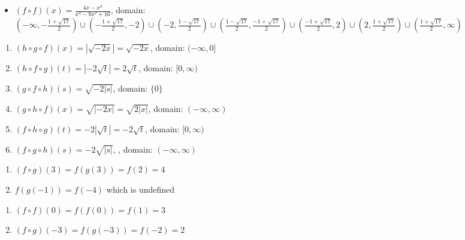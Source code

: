 \begin{enumerate}
\begin{itemize}
\item  $(f \circ f)(x) = \frac{4x-x^3}{x^4-9x^2+16}$, domain: $\left(-\infty, -\frac{1+\sqrt{17}}{2}\right) \cup \left(-\frac{1+\sqrt{17}}{2}, -2\right) \cup \left(-2, \frac{1-\sqrt{17}}{2}\right) \cup \left(\frac{1-\sqrt{17}}{2}, \frac{-1+\sqrt{17}}{2}\right) \cup \left(\frac{-1+\sqrt{17}}{2}, 2\right) \cup \left(2, \frac{1+\sqrt{17}}{2} \right) \cup \left(\frac{1+\sqrt{17}}{2}, \infty\right)$

\end{itemize}
\setcounter{HW}{\value{enumi}}
\end{enumerate}


\begin{enumerate}
\setcounter{enumi}{\value{HW}}

\item $(h\circ g \circ f)(x)= |\sqrt{-2x}|= \sqrt{-2x}$, domain: $(-\infty, 0]$ 

\item $(h\circ f \circ g)(t) = |-2\sqrt{t}|= 2\sqrt{t}$, domain: $[0,\infty)$

\item $(g\circ f \circ h)(s) = \sqrt{-2|s|}$, domain:  $\{0\}$

\item $(g\circ h \circ f)(x) = \sqrt{|-2x|} = \sqrt{2|x|}$, domain: $(-\infty, \infty)$ 

\item $(f\circ h \circ g)(t) = -2|\sqrt{t}| = -2\sqrt{t}$, domain: $[0,\infty)$

\item $(f\circ g \circ h)(s) = -2\sqrt{|s|}$, , domain: $(-\infty,\infty)$

\setcounter{HW}{\value{enumi}}
\end{enumerate}

\begin{multicols}{2}
\begin{enumerate}
\setcounter{enumi}{\value{HW}}

\item $(f \circ g)(3)= f(g(3)) = f(2) = 4$
\item $f(g(-1)) = f(-4)$ which is undefined

\setcounter{HW}{\value{enumi}}
\end{enumerate}
\end{multicols}

\begin{multicols}{2}
\begin{enumerate}
\setcounter{enumi}{\value{HW}}

\item $(f \circ f)(0) = f(f(0)) = f(1) = 3$
\item $(f \circ g)(-3) = f(g(-3)) = f(-2) = 2$

\setcounter{HW}{\value{enumi}}
\end{enumerate}
\end{multicols}


